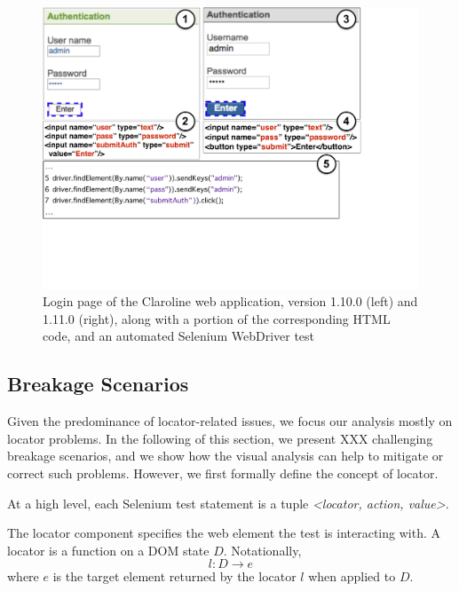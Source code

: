 \begin{figure}[t]
\centering
\includegraphics[trim={0cm 6.5cm 5.5cm 0cm},clip,scale=0.27]{images/claroline-together-2}
\caption{Login page of the Claroline web application, version 1.10.0 (left) and 1.11.0 (right), along with a portion of the corresponding HTML code, and an automated Selenium WebDriver test}
\label{claroline-together}
\end{figure}

\subsection{Breakage Scenarios}\label{sec:breakage-scenarios}

Given the predominance of locator-related issues, we focus our analysis mostly on locator problems. In the following of this section, we present XXX challenging breakage scenarios, and we show how the visual analysis can help to mitigate or correct such problems. However, we first formally define the concept of locator.

\begin{defn}
At a high level, each Selenium test statement is a tuple \textit{<locator, action, value>}.
\end{defn}

\begin{defn} 
The locator component specifies the web element the test is interacting with. A locator is a function on a DOM state $D$. Notationally, $$l: D \rightarrow e$$ where $e$ is the target element returned by the locator $l$ when applied to $D$. 
\end{defn}

